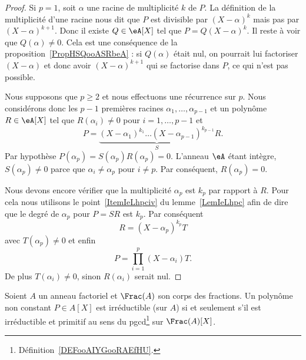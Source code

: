 \begin{proof}
    Si \( p=1\), soit \( \alpha\) une racine de multiplicité \( k\) de \( P\). La définition de la multiplicité d'une racine nous dit que \( P\) est divisible par \( (X-\alpha)^k\) mais pas par \( (X-\alpha)^{k+1}\). Donc il existe \( Q\in \eA[X]\) tel que \( P=Q(X-\alpha)^k\). Il reste à voir que \( Q(\alpha)\neq 0\). Cela est une conséquence de la proposition~\ref{PropHSQooASRbeA} : si \( Q(\alpha)\) était nul, on pourrait lui factoriser \( (X-\alpha)\) et donc avoir \( (X-\alpha)^{k+1}\) qui se factorise dans \( P\), ce qui n'est pas possible.

    Nous supposons que \( p\geq 2\) et nous effectuons une récurrence sur \( p\). Nous considérons donc les \( p-1\) premières racines \( \alpha_1,\ldots, \alpha_{p-1}\) et un polynôme \( R\in\eA[X]\) tel que \( R(\alpha_i)\neq 0\) pour \( i=1,\ldots, p-1\) et
    \begin{equation}
        P=\underbrace{(X-\alpha_1)^{k_1}\ldots (X-\alpha_{p-1})^{k_{p-1}}}_SR.
    \end{equation}
    Par hypothèse \( P(\alpha_p)=S(\alpha_p)R(\alpha_p)=0\). L'anneau \( \eA\) étant intègre, \( S(\alpha_p)\neq 0\) parce que \( \alpha_i\neq \alpha_p\) pour \( i\neq p\). Par conséquent, \( R(\alpha_p)=0\).

    Nous devons encore vérifier que la multiplicité \( \alpha_p\) est \( k_p\) par rapport à \( R\). Pour cela nous utilisons le point~\ref{ItemIeLhpciv} du lemme~\ref{LemIeLhpc} afin de dire que le degré de \( \alpha_p\) pour \( P=SR\) est \( k_p\). Par conséquent
    \begin{equation}
        R=(X-\alpha_p)^{k_p}T
    \end{equation}
    avec \( T(\alpha_p)\neq 0\) et enfin
    \begin{equation}
        P=\prod_{i=1}^p(X-\alpha_i)T.
    \end{equation}
    De plus \( T(\alpha_i)\neq 0\), sinon \( R(\alpha_i)\) serait nul.
\end{proof}

\begin{corollary}       \label{CORooZCSOooHQVAOV}
    Soient \( A\) un anneau factoriel et \( \Frac(A)\) son corps des fractions. Un polynôme non constant \( P\in A[X]\) est irréductible (sur \( A\)) si et seulement s'il est irréductible et primitif au sens du pgcd\footnote{Définition~\ref{DEFooAIYGooRAEfHU}.} sur \( \Frac(A)[X]\).
\end{corollary}

